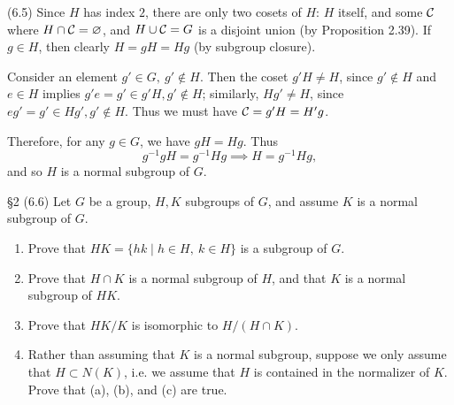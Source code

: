 \documentclass{homework}
\begin{document}
\begin{solution}
  
  (6.5) Since $H$ has index $2$, there are only two cosets of $H$: $H$ itself, and some $\mathcal{C}$
  where $H\cap \mathcal{C}=\varnothing$, and $H\cup \mathcal{C}=G$ is a disjoint union (by Proposition 2.39).
  If $g\in H$, then clearly $H=gH=Hg$ (by subgroup closure). 

  Consider an element $g'\in G,\ g'\not\in H$. Then the coset $g'H\neq H$, since $g'\not\in H$ and
  $e\in H$ implies $g'e=g'\in g'H, g'\not\in H$; similarly, $Hg'\neq H$, since $eg'=g'\in Hg',
  g'\not\in H$. Thus we must have $\mathcal{C}=g'H=H'g$. 

  Therefore, for any $g\in G$, we have $gH=Hg$. Thus \[
    g^{-1}gH=g^{-1}Hg \implies H=g^{-1}Hg
  ,\] and so $H$ is a normal subgroup of $G$.

\end{solution}

\begin{problem}{\S 2}
  (6.6) Let $G$ be a group, $H,K$ subgroups of $G$, and assume $K$ is a normal subgroup of $G$.
  \begin{enumerate}[label=(\alph*)]
    \item Prove that $HK=\{hk\mid h\in H,\ k\in H\} $ is a subgroup of $G$.
    \item Prove that $H\cap K$ is a normal subgroup of $H$, and that $K$ is a normal subgroup of
      $HK$.
    \item Prove that $HK/K$ is isomorphic to $H / (H\cap K)$. 
    \item Rather than assuming that $K$ is a normal subgroup, suppose we only assume that $H\subset
      N(K)$, i.e. we assume that $H$ is contained in the normalizer of $K$. Prove that (a), (b), and
      (c) are true.
  \end{enumerate}
\end{problem}
\end{document}
